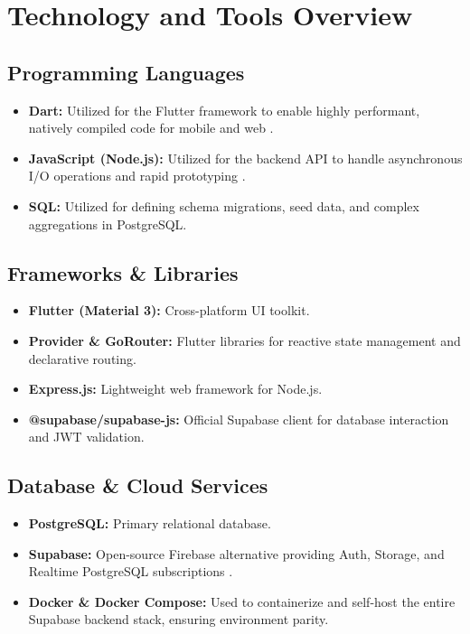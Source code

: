 \chapter{Technology and Tools Overview}

\section{Programming Languages}
\begin{itemize}
    \item \textbf{Dart:} Utilized for the Flutter framework to enable highly performant, natively compiled code for mobile and web \cite{flutter}.
    \item \textbf{JavaScript (Node.js):} Utilized for the backend API to handle asynchronous I/O operations and rapid prototyping \cite{nodejs}.
    \item \textbf{SQL:} Utilized for defining schema migrations, seed data, and complex aggregations in PostgreSQL.
\end{itemize}

\section{Frameworks \& Libraries}
\begin{itemize}
    \item \textbf{Flutter (Material 3):} Cross-platform UI toolkit.
    \item \textbf{Provider \& GoRouter:} Flutter libraries for reactive state management and declarative routing.
    \item \textbf{Express.js:} Lightweight web framework for Node.js.
    \item \textbf{@supabase/supabase-js:} Official Supabase client for database interaction and JWT validation.
\end{itemize}

\section{Database \& Cloud Services}
\begin{itemize}
    \item \textbf{PostgreSQL:} Primary relational database.
    \item \textbf{Supabase:} Open-source Firebase alternative providing Auth, Storage, and Realtime PostgreSQL subscriptions \cite{supabase}.
    \item \textbf{Docker \& Docker Compose:} Used to containerize and self-host the entire Supabase backend stack, ensuring environment parity.
\end{itemize}

